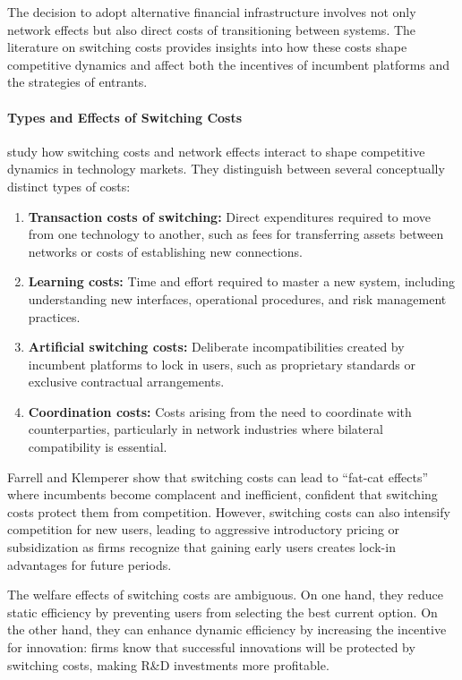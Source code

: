 The decision to adopt alternative financial infrastructure involves not only network effects but also direct costs of transitioning between systems. The literature on switching costs provides insights into how these costs shape competitive dynamics and affect both the incentives of incumbent platforms and the strategies of entrants.

\paragraph{Types and Effects of Switching Costs}

 study how switching costs and network effects interact to shape competitive dynamics in technology markets. They distinguish between several conceptually distinct types of costs:

\begin{enumerate}
    \item \textbf{Transaction costs of switching:} Direct expenditures required to move from one technology to another, such as fees for transferring assets between networks or costs of establishing new connections.
    
    \item \textbf{Learning costs:} Time and effort required to master a new system, including understanding new interfaces, operational procedures, and risk management practices.
    
    \item \textbf{Artificial switching costs:} Deliberate incompatibilities created by incumbent platforms to lock in users, such as proprietary standards or exclusive contractual arrangements.
    
    \item \textbf{Coordination costs:} Costs arising from the need to coordinate with counterparties, particularly in network industries where bilateral compatibility is essential.
\end{enumerate}

Farrell and Klemperer show that switching costs can lead to ``fat-cat effects'' where incumbents become complacent and inefficient, confident that switching costs protect them from competition. However, switching costs can also intensify competition for new users, leading to aggressive introductory pricing or subsidization as firms recognize that gaining early users creates lock-in advantages for future periods.

The welfare effects of switching costs are ambiguous. On one hand, they reduce static efficiency by preventing users from selecting the best current option. On the other hand, they can enhance dynamic efficiency by increasing the incentive for innovation: firms know that successful innovations will be protected by switching costs, making R\&D investments more profitable.

